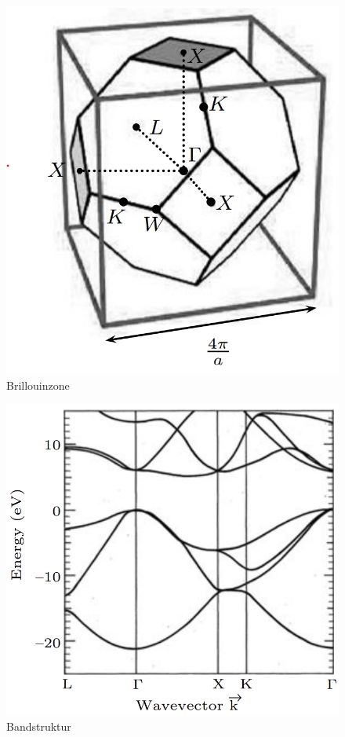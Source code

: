 \documentclass[bfvec]{summery_5.0}
\begin{document}
\begin{minipage}{0.5\textwidth}
    \begin{figure}[H]
        \centering
        \includegraphics[width=.7\textwidth]{brillouin_zone.png}
        \caption{Brillouinzone}
    \end{figure}
\end{minipage}
\begin{minipage}{0.5\textwidth}
    \begin{figure}[H]
        \centering
        \includegraphics[width=.8\textwidth]{effective_mass.png}
        \caption{Bandstruktur}
    \end{figure}
\end{minipage}
\end{document}
